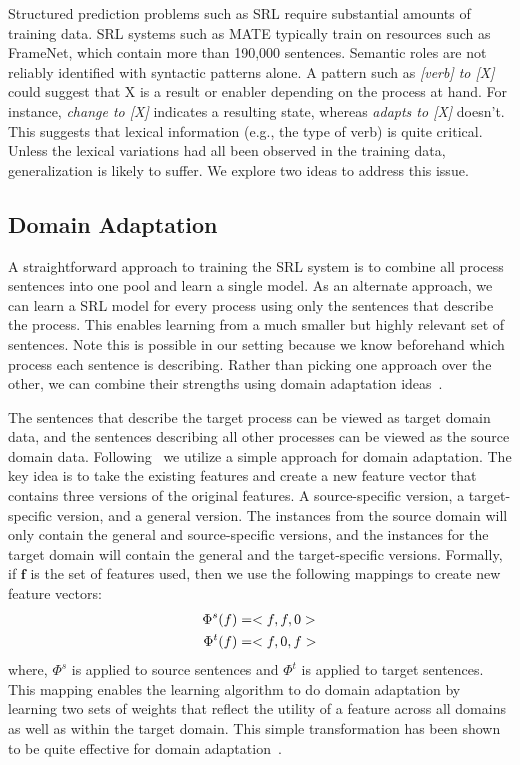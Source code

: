 Structured prediction problems such as SRL require substantial amounts of training data. 
SRL systems such as MATE typically train on resources such as FrameNet, which contain more than 190,000 sentences. 
Semantic roles are not reliably identified with syntactic patterns alone. 
A pattern such as {\em [verb] to [X]} could suggest that X is a result or enabler depending on the process at hand. 
For instance, {\em change to [X]} indicates a resulting state, whereas {\em adapts to [X]} doesn't. 
This suggests that lexical information (e.g., the type of verb) is quite critical. 
Unless the lexical variations had all been observed in the training data, generalization is likely to suffer. 
We explore two ideas to address this issue.

\subsection{Domain Adaptation}
\label{sec:domain-adaptation}
A straightforward approach to training the SRL system is to combine all process sentences into one pool and learn a single model. 
As an alternate approach, we can learn a SRL model for every process using only the sentences that describe the process. 
This enables learning from a much smaller but highly relevant set of sentences. 
Note this is possible in our setting because we know beforehand which process each sentence is describing.
Rather than picking one approach over the other, we can combine their strengths using domain adaptation ideas~\cite{daume2009frustratingly}.

The sentences that describe the target process can be viewed as target domain data, and the sentences describing all other processes can be viewed as the source domain data. Following~\cite{daume2009frustratingly} we utilize a simple approach for domain adaptation. The key idea is to take the existing features and create a new feature vector that contains three versions of the original features. A source-specific version, a target-specific version, and a general version. The instances from the source domain will only contain the general and source-specific versions, and the instances for the target domain will contain the general and the target-specific versions. Formally, if $\mathbf{f}$ is the set of features used, then we use the following mappings to create new feature vectors:
\begin{align*}
\vspace{-2em}
\Phi^{s}(f) &= <f, f, 0>\\
\Phi^{t}(f) &= <f, 0, f>
\vspace{-2em}
\end{align*}
where, $\Phi^s$ is applied to source sentences and $\Phi^t$ is applied to target sentences.
This mapping enables the learning algorithm to do domain adaptation by learning two sets of weights that reflect the utility of a feature across all domains as well as within the target domain. This simple transformation has been shown to be quite effective for domain adaptation~\cite{daume2009frustratingly}.





